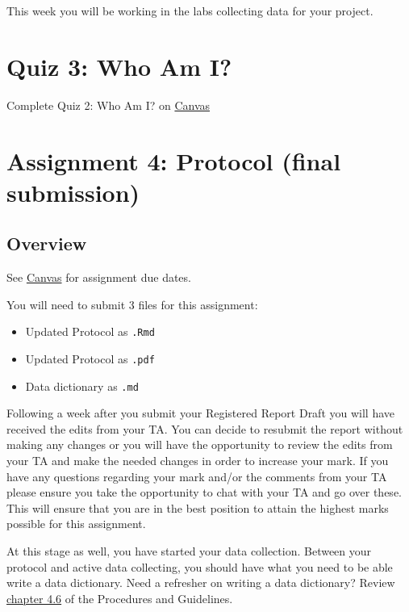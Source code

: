 \documentclass[
]{book}
\providecommand{\tightlist}{%
  \setlength{\itemsep}{0pt}\setlength{\parskip}{0pt}}
\begin{document}
This week you will be working in the labs collecting data for your project.

\hypertarget{quiz-3-who-am-i}{%
\chapter*{Quiz 3: Who Am I?}\label{quiz-3-who-am-i}}

Complete Quiz 2: Who Am I? on \href{https://canvas.ubc.ca/courses/113910}{Canvas}

\hypertarget{assignment-4-protocol-final-submission}{%
\chapter*{Assignment 4: Protocol (final submission)}\label{assignment-4-protocol-final-submission}}

\hypertarget{overview-2}{%
\section*{Overview}\label{overview-2}}

See \href{https://canvas.ubc.ca}{Canvas} for assignment due dates.

You will need to submit 3 files for this assignment:

\begin{itemize}
\tightlist
\item
  Updated Protocol as \texttt{.Rmd}
\item
  Updated Protocol as \texttt{.pdf}
\item
  Data dictionary as \texttt{.md}
\end{itemize}

Following a week after you submit your Registered Report Draft you will have received the edits from your TA. You can decide to resubmit the report without making any changes or you will have the opportunity to review the edits from your TA and make the needed changes in order to increase your mark. If you have any questions regarding your mark and/or the comments from your TA please ensure you take the opportunity to chat with your TA and go over these. This will ensure that you are in the best position to attain the highest marks possible for this assignment.

At this stage as well, you have started your data collection. Between your protocol and active data collecting, you should have what you need to be able write a data dictionary. Need a refresher on writing a data dictionary? Review \href{https://ubco-biology.github.io/Procedures-and-Guidelines/data-dictionary.html}{chapter 4.6} of the Procedures and Guidelines.
\end{document}
